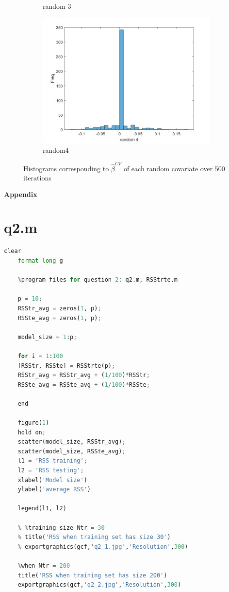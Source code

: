 \documentclass{article}
\begin{document}
\begin{figure}[ht]
\begin{subfigure}[b]{0.5\linewidth}
		\caption{random 3} 
		\label{r3} 
	\end{subfigure}%
	\begin{subfigure}[b]{0.5\linewidth}
		\centering
		\includegraphics[width=0.75\linewidth]{figures/q8_random4.jpg} 
		\caption{random4} 
		\label{r4}
	\end{subfigure} 
	\caption{Histograms corresponding to $ \hat{\beta}^{CV} $ of each random covariate over 500 iterations}
	\label{q8_4} 
\end{figure}




\clearpage
\newpage
\appendix
\centering\textbf{\huge Appendix}
\section{q2.m}
\label{ap:q2}

\begin{lstlisting}[language = python]
	clear
	format long g
	
	%program files for question 2: q2.m, RSStrte.m
	
	p = 10;
	RSStr_avg = zeros(1, p);
	RSSte_avg = zeros(1, p);
	
	model_size = 1:p;
	
	for i = 1:100
	[RSStr, RSSte] = RSStrte(p);
	RSStr_avg = RSStr_avg + (1/100)*RSStr;
	RSSte_avg = RSSte_avg + (1/100)*RSSte;
	
	end
	
	figure(1)
	hold on;
	scatter(model_size, RSStr_avg);
	scatter(model_size, RSSte_avg);
	l1 = 'RSS training';
	l2 = 'RSS testing';
	xlabel('Model size')
	ylabel('average RSS')
	
	legend(l1, l2)
	
	% %training size Ntr = 30
	% title('RSS when training set has size 30')
	% exportgraphics(gcf,'q2_1.jpg','Resolution',300)
	
	%when Ntr = 200
	title('RSS when training set has size 200')
	exportgraphics(gcf,'q2_2.jpg','Resolution',300)
\end{lstlisting}
\end{document}

